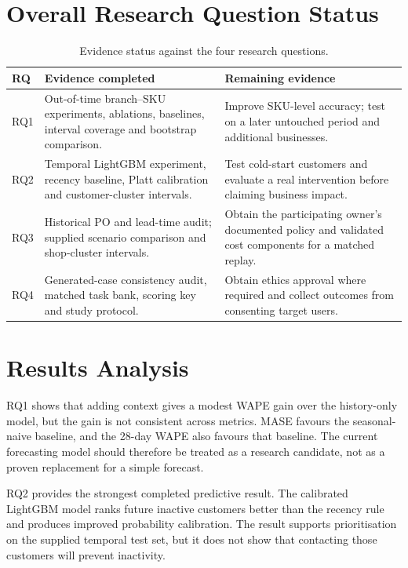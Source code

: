 \section{Overall Research Question Status}
\begin{table}[htbp]
\centering
\small
\begin{tabularx}{\textwidth}{p{0.7cm} X X}
\toprule
\textbf{RQ} & \textbf{Evidence completed} & \textbf{Remaining evidence}\\
\midrule
RQ1 & Out-of-time branch--SKU experiments, ablations, baselines, interval coverage and bootstrap comparison. & Improve SKU-level accuracy; test on a later untouched period and additional businesses.\\
RQ2 & Temporal LightGBM experiment, recency baseline, Platt calibration and customer-cluster intervals. & Test cold-start customers and evaluate a real intervention before claiming business impact.\\
RQ3 & Historical PO and lead-time audit; supplied scenario comparison and shop-cluster intervals. & Obtain the participating owner's documented policy and validated cost components for a matched replay.\\
RQ4 & Generated-case consistency audit, matched task bank, scoring key and study protocol. & Obtain ethics approval where required and collect outcomes from consenting target users.\\
\bottomrule
\end{tabularx}
\caption{Evidence status against the four research questions.}
\label{tab:rq_status}
\end{table}

\section{Results Analysis}
RQ1 shows that adding context gives a modest WAPE gain over the history-only model, but the gain is not consistent across metrics. MASE favours the seasonal-naive baseline, and the 28-day WAPE also favours that baseline. The current forecasting model should therefore be treated as a research candidate, not as a proven replacement for a simple forecast.

RQ2 provides the strongest completed predictive result. The calibrated LightGBM model ranks future inactive customers better than the recency rule and produces improved probability calibration. The result supports prioritisation on the supplied temporal test set, but it does not show that contacting those customers will prevent inactivity.

